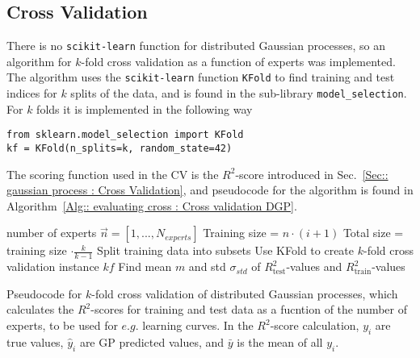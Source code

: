 \documentclass[twoside,english]{uiofysmaster}
\begin{document}
\subsection{Cross Validation}

There is no \verb|scikit-learn| function for distributed Gaussian processes, so an algorithm for $k$-fold cross validation as a function of experts was implemented. The algorithm uses the \verb|scikit-learn| function \verb|KFold| to find training and test indices for $k$ splits of the data, and is found in the sub-library \verb|model_selection|. For $k$ folds it is implemented in the following way
\begin{lstlisting}
from sklearn.model_selection import KFold
kf = KFold(n_splits=k, random_state=42)
\end{lstlisting}
The scoring function used in the CV is the $R^2$-score introduced in Sec.~\ref{Sec:: gaussian process : Cross Validation}, and pseudocode for the algorithm is found in Algorithm~\ref{Alg:: evaluating cross : Cross validation DGP}. 



\begin{algorithm}
number of experts $\vec{n} = [1,...,N_{experts}]$ \;
{
Training size =  $n \cdot (i+1)$\;
Total size = training size $\cdot \frac{k}{k-1}$\;
Split training data into subsets\;
Use KFold to create $k$-fold cross validation instance $kf$\;
Find mean $m$ and std $\sigma_{std}$ of $R^2_{\text{test}}$-values and $R^2_{\text{train}}$-values
}
 \caption{Pseudocode for $k$-fold cross validation of distributed Gaussian processes, which calculates the $R^2$-scores for training and test data as a fucntion of the number of experts, to be used for $e.g.$ learning curves. In the $R^2$-score calculation, $y_i$ are true values, $\hat{y}_i$ are GP predicted values, and $\bar{y}$ is the mean of all $y_i$.}
\label{Alg:: evaluating cross : Cross validation DGP}
\end{algorithm}
\end{document}
